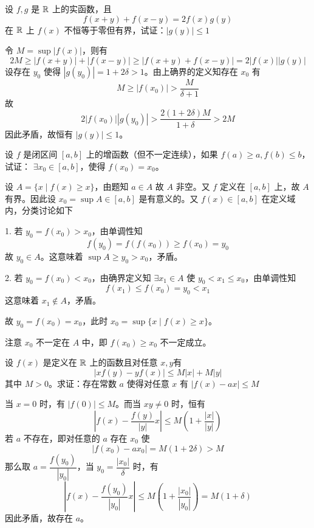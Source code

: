 \begin{problem}[000004]
	设 $f,g$ 是 $\mathbb{R}$ 上的实函数，且
	$$f(x+y)+f(x-y) = 2f(x)g(y)$$
	在 $\mathbb{R}$ 上 $f(x)$ 不恒等于零但有界，试证：$|g(y)|\leqslant 1$
\end{problem}
\begin{solution}
	令 $M=\sup|f(x)|$，则有
	$$2M\geqslant |f(x+y)|+|f(x-y)| \geqslant |f(x+y)+f(x-y)| = 2|f(x)||g(y)|$$
	设存在 $y_0$ 使得 $|g(y_0)|=1+2\delta>1$。由上确界的定义知存在 $x_0$ 有
	$$M \geqslant |f(x_0)| > \frac{M}{\delta+1}$$
	故
	$$2|f(x_0)||g(y_0)| > \frac{2(1+2\delta)M}{1+\delta} > 2M$$
	因此矛盾，故恒有 $|g(y)|\leqslant 1$。
\end{solution}


\begin{problem}[000005]
	设 $f$ 是闭区间 $[a,b]$ 上的增函数（但不一定连续），如果 $f(a) \geqslant a,f(b) \leqslant b$，试证： $\exists x_0 \in [a,b]$，使得 $f(x_0) = x_0$。
\end{problem}
\begin{solution}
	设 $A=\{x \mid f(x) \geqslant x\}$，由题知 $a\in A$ 故 $A$ 非空。又 $f$ 定义在 $[a,b]$ 上，故 $A$ 有界。因此设 $x_0=\sup A\in [a,b]$ 是有意义的。又 $f(x)\in[a,b]$ 在定义域内，分类讨论如下

	1. 若 $y_0=f(x_0) > x_0$，由单调性知
	$$f(y_0)=f(f(x_0)) \geqslant f(x_0) = y_0$$
	故 $y_0\in A$。这意味着 $\sup A \geqslant y_0 >x_0$，矛盾。

	2. 若 $y_0=f(x_0) < x_0$，由确界定义知 $\exists x_1\in A$ 使 $y_0<x_1\leqslant x_0$，由单调性知
	$$f(x_1)\leqslant f(x_0)=y_0 <x_1$$
	这意味着 $x_1\notin A$，矛盾。

	故 $y_0=f(x_0)=x_0$，此时 $x_0 = \sup\{x \mid f(x) \geqslant x\}$。

	注意 $x_0$ 不一定在 $A$ 中，即 $f(x_0) \geqslant x_0$ 不一定成立。
\end{solution}


\begin{problem}[000006]
	设 $f(x)$ 是定义在 $\mathbb{R}$ 上的函数且对任意 $x,y$有
	$$|xf(y)-yf(x)| \leqslant M|x|+M|y|$$
	其中 $M > 0$。求证：存在常数 $a$ 使得对任意 $x$ 有 $|f(x)-ax| \leqslant M$
\end{problem}
\begin{solution}
	当 $x=0$ 时，有 $|f(0)|\leqslant M$。而当 $xy\ne 0$ 时，恒有
	$$\left| f(x)-\frac{f(y)}{|y|}x \right| \leqslant M \left(1+\frac{|x|}{|y|}\right)$$
	若 $a$ 不存在，即对任意的 $a$ 存在 $x_0$ 使
	$$|f(x_0)-ax_0|=M(1+2\delta)>M$$
	那么取 $a = \dfrac{f(y_0)}{|y_0|}$，当 $y_0=\dfrac{|x_0|}{\delta}$ 时，有
	$$\left| f(x)-\frac{f(y_0)}{|y_0|}x \right| \leqslant M \left(1+ \frac{|x_0|}{|y_0|}\right)=M(1+\delta)$$
	因此矛盾，故存在 $a$。
\end{solution}

